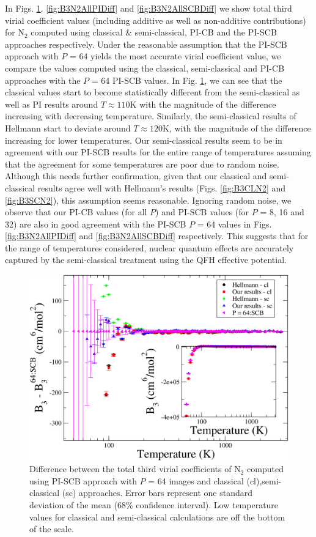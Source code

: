         In Figs. \ref{fig:B3N2AllCLSCDiff}, \ref{fig:B3N2AllPIDiff} and \ref{fig:B3N2AllSCBDiff} we show total third virial coefficient values (including additive as well as non-additive contributions) for N$_2$ computed using classical \& semi-classical, PI-CB and the PI-SCB approaches respectively. Under the reasonable assumption that the PI-SCB approach with $P$ = 64 yields the most accurate virial coefficient value, we compare the values computed using the classical, semi-classical and PI-CB approaches with the $P$ = 64 PI-SCB values. In Fig. \ref{fig:B3N2AllCLSCDiff}, we can see that the classical values start to become statistically different from the semi-classical as well as PI results around $T \approx 110$K with the magnitude of the difference increasing with decreasing temperature. Similarly, the semi-classical results of Hellmann start to deviate around $T \approx 120$K, with the magnitude of the difference increasing for lower temperatures. Our semi-classical results seem to be in agreement with our PI-SCB results for the entire range of temperatures assuming that the agreement for some temperatures are poor due to random noise. Although this needs further confirmation, given that our classical and semi-classical results agree well with Hellmann's results (Figs. \ref{fig:B3CLN2} and \ref{fig:B3SCN2}), this assumption seems reasonable. Ignoring random noise, we observe that our PI-CB values (for all $P$) and PI-SCB values (for $P$ = 8, 16 and 32) are also in good agreement with the PI-SCB $P$ = 64 values in Figs. \ref{fig:B3N2AllPIDiff} and \ref{fig:B3N2AllSCBDiff} respectively. This suggests that for the range of temperatures considered, nuclear quantum effects are accurately captured by the semi-classical treatment using the QFH effective potential.
        \begin{figure}[!htbp]
            \centering
            \includegraphics[scale=0.20,keepaspectratio]{Chapter-5/Figures/B3N2AllCLSCDiff.png}
            \caption{Difference between the total third virial coefficients of N$_2$ computed using PI-SCB approach with $P$ = 64 images and classical (cl),semi-classical (sc) approaches. Error bars represent one standard deviation of the mean (68\% confidence interval). Low temperature values for classical and semi-classical calculations are off the bottom of the scale.}
            \label{fig:B3N2AllCLSCDiff}
        \end{figure}
